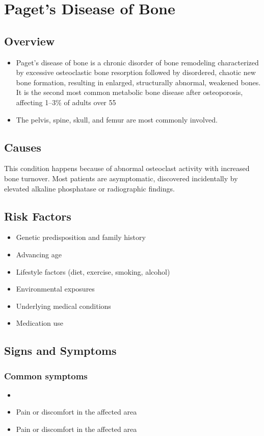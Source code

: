 \chapter{Paget's Disease of Bone}
\label{sec:Paget's Disease of Bone}

\section{Overview}


\begin{itemize}[noitemsep]
  \item Paget's disease of bone is a chronic disorder of bone remodeling characterized by excessive osteoclastic bone resorption followed by disordered, chaotic new bone formation, resulting in enlarged, structurally abnormal, weakened bones. It is the second most common metabolic bone disease after osteoporosis, affecting 1--3\% of adults over 55
  \item The pelvis, spine, skull, and femur are most commonly involved.
\end{itemize}
\section{Causes}
This condition happens because of abnormal osteoclast activity with increased bone turnover. Most patients are asymptomatic, discovered incidentally by elevated alkaline phosphatase or radiographic findings.     
\section{Risk Factors}

\begin{itemize}[noitemsep]
  \item Genetic predisposition and family history
  \item Advancing age
  \item Lifestyle factors (diet, exercise, smoking, alcohol)
  \item Environmental exposures
  \item Underlying medical conditions
  \item Medication use
\end{itemize}
\section{Signs and Symptoms}

\subsection{Common symptoms}
\begin{itemize}[noitemsep]
  \item \item Pain or discomfort in the affected area    \item Pain or discomfort in the affected area
  \end{itemize}

